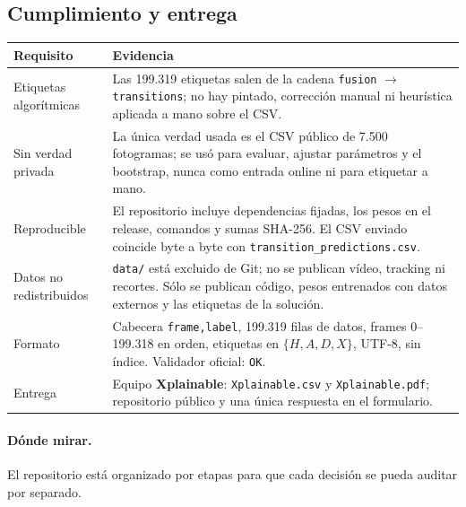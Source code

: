 \documentclass[10pt,a4paper]{article}
\begin{document}
\subsection*{Cumplimiento y entrega}

\begin{center}
\footnotesize
\begin{tabularx}{\textwidth}{@{}>{\raggedright\arraybackslash}p{3.9cm}X@{}}
\toprule
Requisito & Evidencia \\
\midrule
Etiquetas algorítmicas & Las 199.319 etiquetas salen de la cadena
\texttt{fusion} $\to$ \texttt{transitions}; no hay pintado, corrección manual ni heurística
aplicada a mano sobre el CSV. \\
Sin verdad privada & La única verdad usada es el CSV público de 7.500 fotogramas; se usó para
evaluar, ajustar parámetros y el bootstrap, nunca como entrada online ni para etiquetar a mano. \\
Reproducible & El repositorio incluye dependencias fijadas, los pesos en el release, comandos y
sumas SHA-256. El CSV enviado coincide byte a byte con
\texttt{transition\_predictions.csv}. \\
Datos no redistribuidos & \texttt{data/} está excluido de Git; no se publican vídeo, tracking ni
recortes. Sólo se publican código, pesos entrenados con datos externos y las etiquetas de la
solución. \\
Formato & Cabecera \texttt{frame,label}, 199.319 filas de datos, frames 0--199.318 en orden,
etiquetas en $\{H,A,D,X\}$, UTF-8, sin índice. Validador oficial: \texttt{OK}. \\
Entrega & Equipo \textbf{Xplainable}: \texttt{Xplainable.csv} y \texttt{Xplainable.pdf};
repositorio público y una única respuesta en el formulario. \\
\bottomrule
\end{tabularx}
\end{center}

\paragraph{Dónde mirar.}
El repositorio está organizado por etapas para que cada decisión se pueda auditar por separado.
\end{document}

